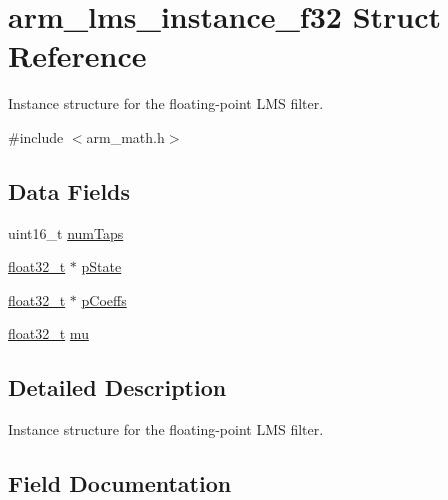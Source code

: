 \hypertarget{structarm__lms__instance__f32}{}\section{arm\+\_\+lms\+\_\+instance\+\_\+f32 Struct Reference}
\label{structarm__lms__instance__f32}


Instance structure for the floating-\/point L\+MS filter.  




{\ttfamily \#include $<$arm\+\_\+math.\+h$>$}

\subsection*{Data Fields}
\begin{DoxyCompactItemize}
\item 
uint16\+\_\+t \mbox{\hyperlink{structarm__lms__instance__f32_a751941891e47f522a7f5375fe8990aac}{num\+Taps}}
\item 
\mbox{\hyperlink{arm__math_8h_a4611b605e45ab401f02cab15c5e38715}{float32\+\_\+t}} $\ast$ \mbox{\hyperlink{structarm__lms__instance__f32_a335c87e6fdc4b96601d95a5de8b9c463}{p\+State}}
\item 
\mbox{\hyperlink{arm__math_8h_a4611b605e45ab401f02cab15c5e38715}{float32\+\_\+t}} $\ast$ \mbox{\hyperlink{structarm__lms__instance__f32_aacbb8dd8eeba4b21fc2bb40076405ee3}{p\+Coeffs}}
\item 
\mbox{\hyperlink{arm__math_8h_a4611b605e45ab401f02cab15c5e38715}{float32\+\_\+t}} \mbox{\hyperlink{structarm__lms__instance__f32_a11402afa7c9b9dac4cb953fa386e74d2}{mu}}
\end{DoxyCompactItemize}


\subsection{Detailed Description}
Instance structure for the floating-\/point L\+MS filter. 

\subsection{Field Documentation}
\mbox{\label{structarm__lms__instance__f32_a11402afa7c9b9dac4cb953fa386e74d2}} 
